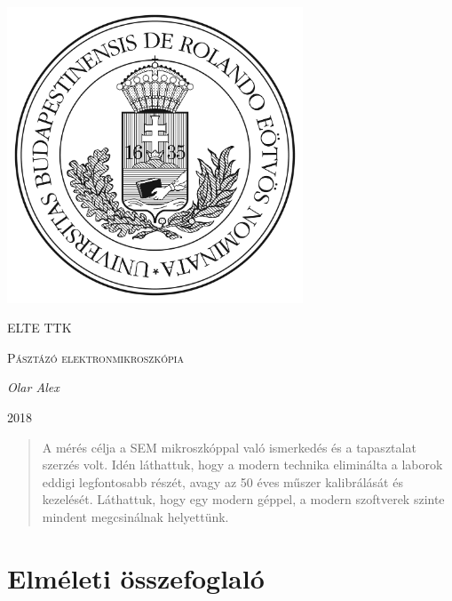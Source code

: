 \documentclass[a4paper,12pt]{article}
\begin{document}
\linespread{1.2}

\begin{titlepage}

	\centering
	\includegraphics[width=0.66\textwidth]{../elte.jpg}\par\vspace{1cm}
	{\scshape\LARGE ELTE TTK \par}
	\vspace{3cm}
	{\scshape\Large Pásztázó elektronmikroszkópia\par}
	\vspace{1cm}
	{\large\itshape Olar Alex\par}
	\vspace{3cm}
	{\large 2018 \par}

\end{titlepage}

\begin{abstract}
	\par A mérés célja a SEM mikroszkóppal való ismerkedés és a tapasztalat szerzés volt. Idén láthattuk, hogy
	a modern technika eliminálta a laborok eddigi legfontosabb részét, avagy az 50 éves műszer kalibrálását és
	kezelését. Láthattuk, hogy egy modern géppel, a modern szoftverek szinte mindent megcsinálnak helyettünk.
\end{abstract}

\vfill

\tableofcontents

\newpage

\section{ Elméleti összefoglaló}
\end{document}
